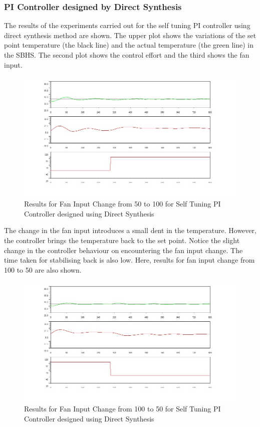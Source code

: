 \subsubsection{PI Controller designed by Direct Synthesis}
The results of the experiments carried out for the self tuning PI controller using direct synthesis method are shown. The upper plot shows the variations of the set point temperature (the black line) and the actual temperature (the green line) in the SBHS. The second plot shows the control effort and the third shows the fan input.

\begin{figure}[h]
	\centering
\includegraphics[width=0.7\linewidth]{Vikas_self/report_tex/PID_results/self_tuning/FanDisturbance/DirectSynthesis/step50to100.jpg}
	\caption{Results for Fan Input Change from 50 to 100 for Self Tuning PI Controller  designed using Direct Synthesis}
\end{figure}
The change in the fan input introduces a small dent in the temperature. However, the controller brings the temperature back to the set point. Notice the slight change in the controller behaviour on encountering the fan input change. The time taken for stabilising back is also low.
\newpage
Here, results for fan input change from 100 to 50 are also shown.
\begin{figure}[h]
	\centering
\includegraphics[width=0.7\linewidth]{Vikas_self/report_tex/PID_results/self_tuning/FanDisturbance/DirectSynthesis/step100to50.jpg}
	\caption{Results for Fan Input Change from 100 to 50 for Self Tuning PI Controller  designed using Direct Synthesis}
\end{figure}

